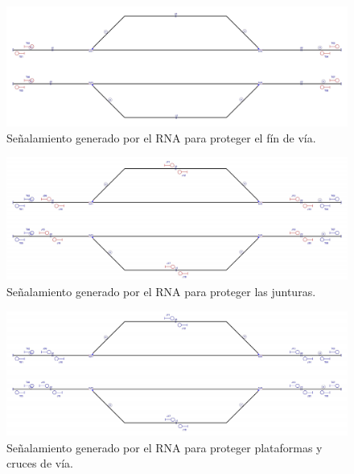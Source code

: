     \begin{figure}[h]
        \centering
        \includegraphics[width=1\textwidth]{resultados-obtenidos/ejemplo5/images/5_step1.png}
        \centering\caption{Señalamiento generado por el RNA para proteger el fín de vía.}
    \end{figure}

    \begin{figure}[h]
        \centering
        \includegraphics[width=1\textwidth]{resultados-obtenidos/ejemplo5/images/5_step2.png}
        \centering\caption{Señalamiento generado por el RNA para proteger las junturas.}
    \end{figure}

    \begin{figure}[h]
        \centering
        \includegraphics[width=1\textwidth]{resultados-obtenidos/ejemplo5/images/5_step3.png}
        \centering\caption{Señalamiento generado por el RNA para proteger plataformas y cruces de vía.}
    \end{figure}

